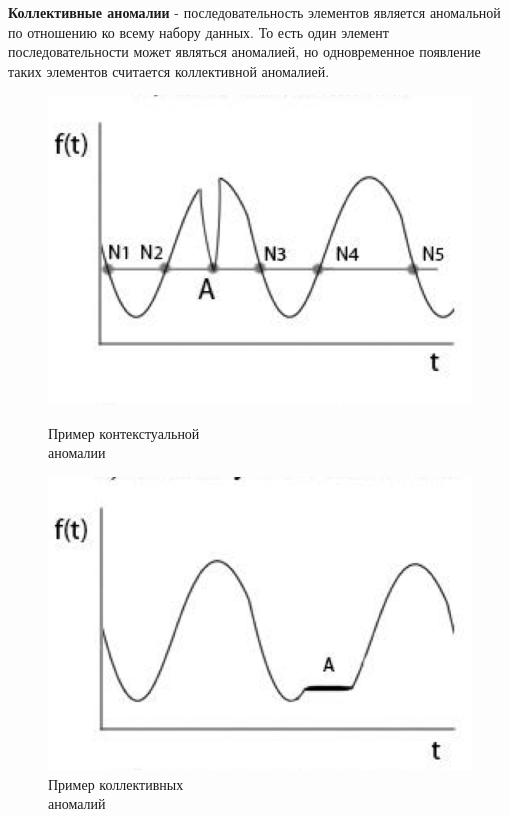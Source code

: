 \documentclass[14pt, a4paper]{extarticle}
\begin{document}
	 \textbf{Коллективные аномалии} -	последовательность элементов  является аномальной по отношению ко всему набору данных. То есть один элемент последовательности может являться аномалией, но одновременное появление таких элементов считается коллективной аномалией. 
	\begin{figure}[!htb]
		\includegraphics[width=\linewidth]{figures/anomaly_type2.png}
		\caption{Пример контекстуальной \\аномалии}
		\endminipage\hfill
		\includegraphics[width=\linewidth]{figures/anomaly_type3.png}
		\caption{Пример коллективных\\ аномалий}
		\endminipage
	\end{figure}
	
\end{document}
